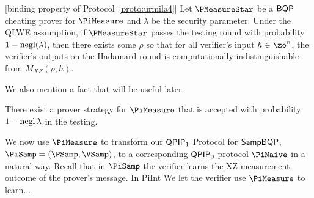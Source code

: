 \begin{lemma}\label{lem:urmila-binding}[binding property of Protocol~\ref{proto:urmila4}\cite{FOCS:Mahadev18a}]
	Let $\PMeasureStar$ be a $\operatorname{\mathsf{BQP}}$ cheating  prover for $\PiMeasure$ and $\lambda$ be the security parameter. Under the QLWE assumption, if $\PMeasureStar$ passes the testing round with probability $1-\negl(\lambda)$, then there exists some $\rho$ so that for all verifier's input $h \in \zo^n$, the verifier's outputs on the Hadamard round is computationally indistinguishable from $M_{XZ}(\rho, h)$.
\iffalse	
	Suppose that for all $\lambda\in\bbN$ and $h\in\zo^*$ \Ethan{or $\zo^n$?},
	$\PMeasureStar$ passes the testing round with probability $1-\negl(\lambda)$.
	Then, under the QLWE assumption, there exists some $\rho$ so that for all $h$,
	the verifier's outputs on the Hadamard round is $\negl(\lambda)$-computationally indistinguishable from $M_{XZ}(\rho, h)$.
\fi
\end{lemma}

We also mention a fact that will be useful later.
\begin{fact}
\label{lem:trivial-4-round-strategy}
   There exist a prover strategy for $\PiMeasure$ that is accepted with probability $1-\operatorname{negl}{\lambda}$  in the testing.
\end{fact}


We now use $\PiMeasure$ to transform our $\operatorname{\mathsf{QPIP}}_1$ Protocol for $\operatorname{\mathsf{SampBQP}}$, $\PiSamp=(\PSamp, \VSamp)$, to a corresponding $\operatorname{\mathsf{QPIP}}_0$ protocol $\PiNaive$ in a natural way.
Recall that in $\PiSamp$ the verifier learns the XZ measurement outcome of the prover's message.
In PiInt We let the verifier use $\PiMeasure$ to learn...

